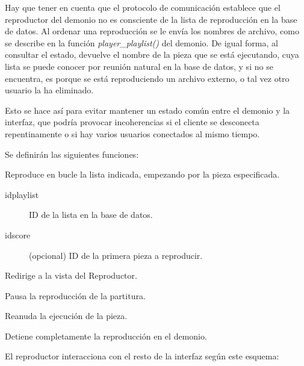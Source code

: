 Hay que tener en cuenta que el protocolo de comunicación establece que el reproductor del demonio no es consciente de la lista de reproducción en la base de datos. Al ordenar una reproducción se le envía los nombres de archivo, como se describe en la función \textit{player\_playlist()} del demonio. De igual forma, al consultar el estado, devuelve el nombre de la pieza que se está ejecutando, cuya lista se puede conocer por reunión natural en la base de datos, y si no se encuentra, es porque se está reproduciendo un archivo externo, o tal vez otro usuario la ha eliminado.

Esto se hace así para evitar mantener un estado común entre el demonio y la interfaz, que podría provocar incoherencias si el cliente se desconecta repentinamente o si hay varios usuarios conectados al mismo tiempo.

Se definirán las siguientes funciones:

\begin{description}[style=nextline]
	\item[play (idplaylist, idscore)]
	Reproduce en bucle la lista indicada, empezando por la pieza especificada.
	
	\begin{description}
		\item[idplaylist] ID de la lista en la base de datos.
		\item[idscore] (opcional) ID de la primera pieza a reproducir.
	\end{description}
	
	Redirige a la vista del Reproductor.
	
	\item[pause ()]
	Pausa la reproducción de la partitura.
	
	\item[resume ()]
	Reanuda la ejecución de la pieza.
	
	\item[stop ()]
	Detiene completamente la reproducción en el demonio.
	
\end{description}

El reproductor interacciona con el resto de la interfaz según este esquema:

\smallskip

